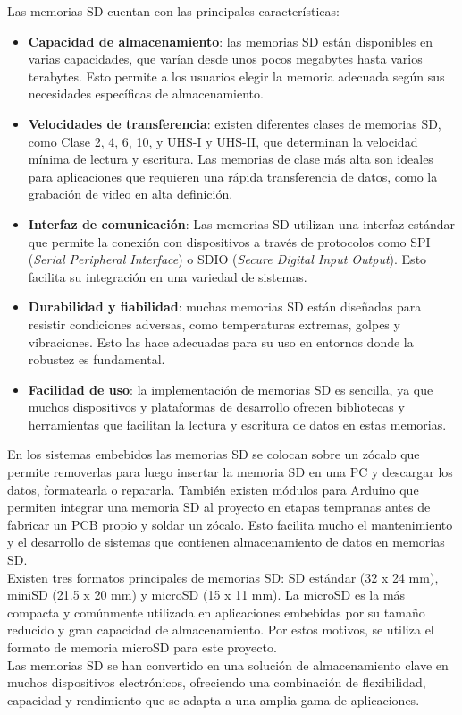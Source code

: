 Las memorias SD cuentan con las principales características: 
\begin{itemize}
    \item \textbf{Capacidad de almacenamiento}: las memorias SD están disponibles en varias capacidades, que varían desde unos pocos megabytes hasta varios terabytes. Esto permite a los usuarios elegir la memoria adecuada según sus necesidades específicas de almacenamiento.
    \item \textbf{Velocidades de transferencia}: existen diferentes clases de memorias SD, como Clase 2, 4, 6, 10, y UHS-I y UHS-II, que determinan la velocidad mínima de lectura y escritura. Las memorias de clase más alta son ideales para aplicaciones que requieren una rápida transferencia de datos, como la grabación de video en alta definición.
    \item \textbf{Interfaz de comunicación}: Las memorias SD utilizan una interfaz estándar que permite la conexión con dispositivos a través de protocolos como SPI (\textit{Serial Peripheral Interface}) o SDIO (\textit{Secure Digital Input Output}). Esto facilita su integración en una variedad de sistemas.
    \item \textbf{Durabilidad y fiabilidad}: muchas memorias SD están diseñadas para resistir condiciones adversas, como temperaturas extremas, golpes y vibraciones. Esto las hace adecuadas para su uso en entornos donde la robustez es fundamental.
    \item \textbf{Facilidad de uso}: la implementación de memorias SD es sencilla, ya que muchos dispositivos y plataformas de desarrollo ofrecen bibliotecas y herramientas que facilitan la lectura y escritura de datos en estas memorias.
\end{itemize}


En los sistemas embebidos las memorias SD se colocan sobre un zócalo que permite removerlas para luego insertar la memoria SD en una PC y descargar los datos, formatearla o repararla. También existen módulos para Arduino que permiten integrar una memoria SD al proyecto en etapas tempranas antes de fabricar un PCB propio y soldar un zócalo. Esto facilita mucho el mantenimiento y el desarrollo de sistemas que contienen almacenamiento de datos en memorias SD. \\

Existen tres formatos principales de memorias SD: SD estándar (32 x 24 mm), miniSD (21.5 x 20 mm) y microSD (15 x 11 mm). La microSD\textbf{ }es la más compacta y comúnmente utilizada en aplicaciones embebidas por su tamaño reducido y gran capacidad de almacenamiento. Por estos motivos, se utiliza el formato de memoria microSD para este proyecto. \\

Las memorias SD se han convertido en una solución de almacenamiento clave en muchos dispositivos electrónicos, ofreciendo una combinación de flexibilidad, capacidad y rendimiento que se adapta a una amplia gama de aplicaciones. 
